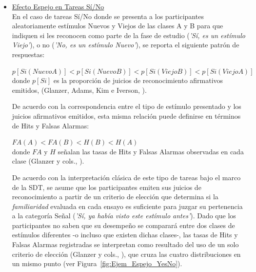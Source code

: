\begin{itemize}
\item \underline{Efecto Espejo en Tareas Sí/No}\\

En el caso de tareas Sí/No donde se presenta a los participantes aleatoriamente estímulos Nuevos y Viejos de las clases A y B para que indiquen si les reconocen como parte de la fase de estudio (\textit{'Sí, es un estímulo Viejo'}), o no (\textit{'No, es un estímulo Nuevo'}), se reporta el siguiente patrón de respuestas:

\begin{center}
$p[Si(NuevoA)] < p[Si(NuevoB)] < p[Si(ViejoB)] < p[Si(ViejoA)]$\\
donde $p[Si]$ es la proporción de juicios de reconocimiento afirmativos emitidos, (Glanzer, Adams, Kim e Iverson, \citeyear{Glanzer1993}).\\
\end{center}

De acuerdo con la correspondencia entre el tipo de estímulo presentado y los juicios afirmativos emitidos, esta misma relación puede definirse en términos de Hits y Falsas Alarmas:

\begin{center}
$FA(A) < FA(B) < H(B) < H(A)$\\
donde $FA$ y $H$ señalan las tasas de Hits y Falsas Alarmas observadas en cada clase (Glanzer y cols., \citeyear{Glanzer1993}).\\
\end{center}

De acuerdo con la interpretación clásica de este tipo de tareas bajo el marco de la SDT, se asume que los participantes emiten sus juicios de reconocimiento a partir de un criterio de elección que determina si la \textit{familiaridad} evaluada en cada ensayo es suficiente para juzgar su pertenencia a la categoría Señal (\textit{'Sí, ya había visto este estímulo antes'}). Dado que los participantes no saben que su desempeño se comparará entre dos clases de estímulos diferentes -o incluso que existen dichas clases-, las tasas de Hits y Falsas Alarmas registradas se interpretan como resultado del uso de un solo criterio de elección (Glanzer y cols., \citeyear{Glanzer1993}), que cruza las cuatro distribuciones en un mismo punto (ver Figura~\ref{fig:Ejem_Espejo_YesNo}).\\


\end{itemize}
